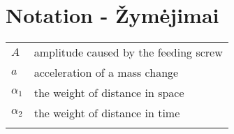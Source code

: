 \chapter*{Notation - Žymėjimai}
\label{cha:notation}

\noindent
 \begin{longtable}[l]{ p{3cm} p{8cm} } %
    $A$         & amplitude caused by the feeding screw \\
	$a$         & acceleration of a mass change \\
	$\alpha_1$  & the weight of distance in space \\
	$\alpha_2$  & the weight of distance in time \\
    \label{tab:notation}
\end{longtable}



